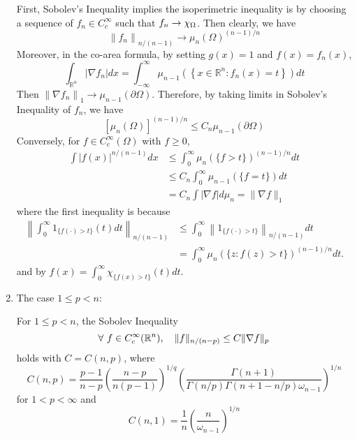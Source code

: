 \begin{enumerate}[label=\Roman*.]
	\noindent First, Sobolev's Inequality implies the isoperimetric inequality is by choosing a sequence of $f_n \in C_c^\infty$ such that $f_n \rightarrow \chi_\Omega$. Then clearly, we have
	\begin{equation*}
		\left\|f_n\right\|_{n /(n-1)} \rightarrow \mu_n(\Omega)^{(n-1) / n}
	\end{equation*}
	Moreover, in the co-area formula, by setting $g(x) = 1$ and $f(x) = f_n(x)$,
	\begin{equation*}
		\int_{\mathbb{R}^n}\left|\nabla f_n\right| d x=\int_{-\infty}^{\infty} \mu_{n-1}\left(\left\{x \in \mathbb{R}^n: f_n(x)=t\right\}\right) d t
	\end{equation*}
	Then $\left\|\nabla f_n\right\|_1 \rightarrow \mu_{n-1}(\partial \Omega)$. Therefore, by taking limits in Sobolev's Inequality of $f_n$, we have
	\begin{equation*}
		\left[\mu_n(\Omega)\right]^{(n-1) / n} \leq C_n \mu_{n-1}(\partial \Omega)
	\end{equation*}
	Conversely, for $f \in C_c^\infty(\Omega)$ with $f \geq 0$,
	\begin{equation*}
		\begin{aligned}
			\int|f(x)|^{n /(n-1)} d x & \leq \int_0^{\infty} \mu_n(\{f>t\})^{(n-1) / n} d t \\
			& \leq C_n \int_0^{\infty} \mu_{n-1}(\{f=t\}) d t \\
			& =C_n \int|\nabla f| d \mu_n=\|\nabla f\|_1
		\end{aligned}
	\end{equation*}
	where the first inequality is because
	\begin{equation*}
		\begin{aligned}
			\left\|\int_0^{\infty} 1_{\{f(\cdot)>t\}}(t) d t\right\|_{n /(n-1)} & \leq \int_0^{\infty}\left\|1_{\{f(\cdot)>t\}}\right\|_{n /(n-1)} d t \\
			& =\int_0^{\infty} \mu_n(\{z: f(z)>t\})^{(n-1) / n} d t .
		\end{aligned}
	\end{equation*}
	and by $f(x)=\int_0^{\infty} \chi_{\{f(x)>t\}}(t) d t$.

	\item The case $1 \leq p < n$:

	\begin{thm}
		For $1 \leq p < n$, the Sobolev Inequality
		\begin{equation*}
			\forall~f \in C_c^\infty(\mathbb{R}^n),\quad \|f\|_{n/(n-p)} \leq C\|\nabla f\|_p
		\end{equation*}
		holds with $C = C(n,p)$, where
		\begin{equation*}
			C(n, p)=\frac{p-1}{n-p}\left(\frac{n-p}{n(p-1)}\right)^{1 / q}\left(\frac{\Gamma(n+1)}{\Gamma(n / p) \Gamma(n+1-n / p) \omega_{n-1}}\right)^{1 / n}
		\end{equation*}
		for $1 < p < \infty$ and 
		\begin{equation*}
			C(n, 1)=\frac{1}{n}\left(\frac{n}{\omega_{n-1}}\right)^{1 / n}
		\end{equation*}
	\end{thm}


\end{enumerate}
